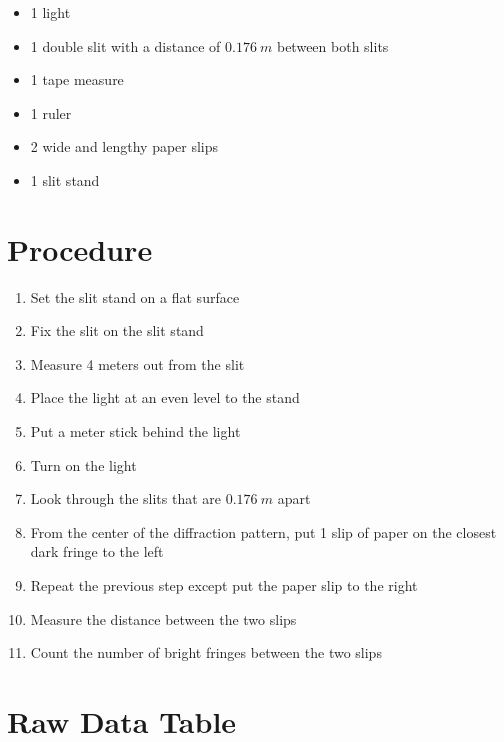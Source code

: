 \documentclass[12pt]{article}
\begin{document}
\begin{itemize}
	\item 1 light
	\item 1 double slit with a distance of $0.176\ m$ between both slits
	\item 1 tape measure
	\item 1 ruler
	\item 2 wide and lengthy paper slips
	\item 1 slit stand
\end{itemize}

\section{Procedure}

\begin{enumerate}
	\item Set the slit stand on a flat surface
	\item Fix the slit on the slit stand
	\item Measure 4 meters out from the slit
	\item Place the light at an even level to the stand
	\item Put a meter stick behind the light
	\item Turn on the light
	\item Look through the slits that are $0.176\ m$ apart
	\item From the center of the diffraction pattern, put 1 slip of paper on the closest dark fringe to the left
	\item Repeat the previous step except put the paper slip to the right
	\item Measure the distance between the two slips
	\item Count the number of bright fringes between the two slips
\end{enumerate}

\section{Raw Data Table}

\begin{table}[H]
	\def\arraystretch{1.5}
\end{table}
\end{document}
